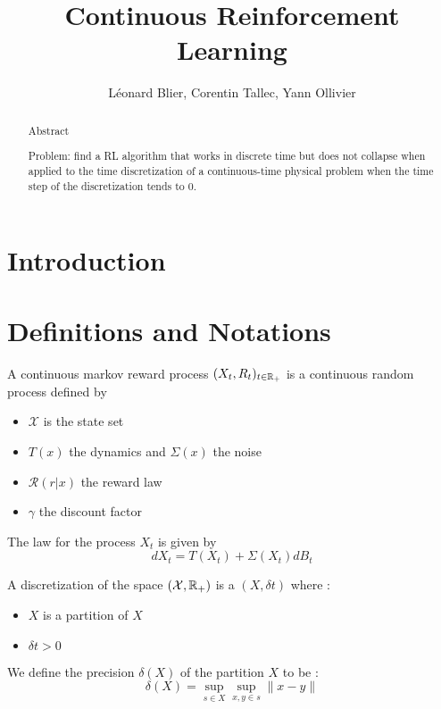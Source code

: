 \documentclass{article}
\title{Continuous Reinforcement Learning}
\author{L\'eonard Blier, Corentin Tallec, Yann Ollivier}
\begin{document}
\maketitle


\begin{abstract}
Abstract

Problem: find a RL algorithm that works in discrete time but does not
collapse when applied to the time discretization of a continuous-time
physical problem when the time step of the discretization tends to $0$.
\end{abstract}

\section{Introduction}
\label{sec:introduction}


\section{Definitions and Notations}
\label{sec:definitions}

\begin{definition}
  A continuous markov reward process $(X_{t}, R_{t})_{t\in\mathbb{R}_{+}}$ is a continuous random process defined by 
  \begin{itemize}
  \item $\mathcal{X}$ is the state set 
  \item $T(x)$ the dynamics and $\Sigma (x)$ the noise
  \item $\mathcal{R}(r|x)$ the reward law
  \item $\gamma$ the discount factor
  \end{itemize}
  The law for the process $X_{t}$ is given by
  \begin{equation}
    \label{eq:eqdiffstoch}
    dX_{t} = T(X_{t}) + \Sigma(X_{t})dB_{t}
  \end{equation}
\end{definition}


\begin{definition}
  A discretization of the space $(\mathcal{X}, \mathbb{R}_{+})$ is a $(X, \delta t)$ where :
  \begin{itemize}
  \item $X$ is a partition of $X$
  \item $\delta t > 0$
  \end{itemize}
  We define the precision $\delta(X)$ of the partition $X$ to be :
  \begin{equation}
    \label{eq:2}
    \delta(X) = \sup_{s\in X}\sup_{x,y \in s}\|x-y\|
  \end{equation}
\end{definition}
\end{document}
